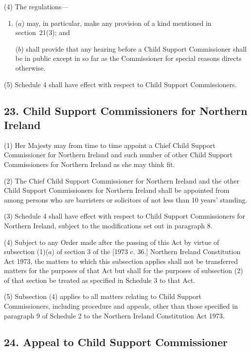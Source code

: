 \documentclass[12pt,a4paper]{article}
\begin{document}
(4) The regulations—
\begin{enumerate}\item[]
($a$) may, in particular, make any provision of a kind mentioned in section~21(3); and

($b$) shall provide that any hearing before a Child Support Commissioner shall be in public except in so far as the Commissioner for special reasons directs otherwise.
\end{enumerate}

(5) Schedule 4 shall have effect with respect to Child Support Commissioners.


\subsection{23. Child Support Commissioners for Northern Ireland}

(1) Her Majesty may from time to time appoint a Chief Child Support Commissioner for Northern Ireland and such number of other Child Support Commissioners for Northern Ireland as she may think fit.

(2) The Chief Child Support Commissioner for Northern Ireland and the other Child Support Commissioners for Northern Ireland shall be appointed from among persons who are barristers or solicitors of not less than 10 years' standing.

(3) Schedule 4 shall have effect with respect to Child Support Commissioners for Northern Ireland, subject to the modifications set out in paragraph 8.

(4) Subject to any Order made after the passing of this Act by virtue of subsection (1)($a$)  of section 3 of the [1973 c. 36.] Northern Ireland Constitution Act 1973, the matters to which this subsection applies shall not be transferred matters for the purposes of that Act but shall for the purposes of subsection (2)  of that section be treated as specified in Schedule 3 to that Act.

(5) Subsection (4)  applies to all matters relating to Child Support Commissioners, including procedure and appeals, other than those specified in paragraph 9 of Schedule 2 to the Northern Ireland Constitution Act 1973.


\subsection{24. Appeal to Child Support Commissioner}
\end{document}
